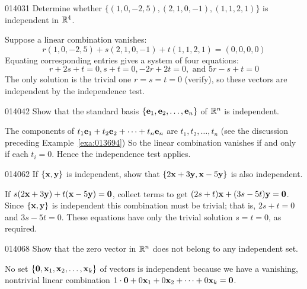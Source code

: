 \begin{example}{}{014031}
Determine whether $\{(1, 0, -2, 5), (2, 1, 0, -1), (1, 1, 2, 1)\}$ is independent in $\mathbb{R}^4$.

\begin{solution}
  Suppose a linear combination vanishes:
\begin{equation*}
r(1, 0, -2, 5) + s(2, 1, 0, -1) + t(1, 1, 2, 1) = (0, 0, 0, 0)
\end{equation*}
Equating corresponding entries gives a system of four equations:
\begin{equation*}
r + 2s + t = 0, s + t = 0, -2r + 2t = 0, \mbox{ and } 5r -s + t = 0
\end{equation*}
The only solution is the trivial one $r = s = t = 0$ (verify), so these vectors are independent by the independence test.
\end{solution}
\end{example}

\begin{example}{}{014042}
Show that the standard basis $\{\textbf{e}_{1}, \textbf{e}_{2}, \dots, \textbf{e}_{n}\}$ of $\mathbb{R}^n$ is independent.

\begin{solution}
The components of $t_{1}\textbf{e}_{1} + t_{2}\textbf{e}_{2} + \dots + t_{n}\textbf{e}_{n}$ are $t_{1}, t_{2}, \dots, t_{n}$ (see the discussion preceding Example~\ref{exa:013694}) So the linear combination vanishes if and only if each $t_{i} = 0$. Hence the independence test applies.
\end{solution}
\end{example}

\begin{example}{}{014062}
If $\{\textbf{x}, \textbf{y}\}$ is independent, show that $\{2\textbf{x} + 3\textbf{y}, \textbf{x} - 5\textbf{y}\}$ is also independent.

\begin{solution}
If $s(2\textbf{x} + 3\textbf{y}) + t(\textbf{x} - 5\textbf{y}) = \textbf{0}$, collect terms to get $(2s + t)\textbf{x} + (3s - 5t)\textbf{y} = \textbf{0}$. Since $\{\textbf{x}, \textbf{y}\}$ is independent this combination must be trivial; that is, $2s + t = 0$ and $3s - 5t = 0$. These equations have only the trivial solution $s = t = 0$, as required.
\end{solution}
\end{example}

\begin{example}{}{014068}
Show that the zero vector in $\mathbb{R}^n$ does not belong to any independent set.

\begin{solution}
  No set $\{\textbf{0}, \textbf{x}_{1}, \textbf{x}_{2}, \dots, \textbf{x}_{k}\}$ of vectors is independent because we have a vanishing, nontrivial
  linear combination $1 \cdot \textbf{0} + 0\textbf{x}_{1} + 0\textbf{x}_{2} + \dots + 0\textbf{x}_{k} = \textbf{0}$.
\end{solution}
\end{example}

